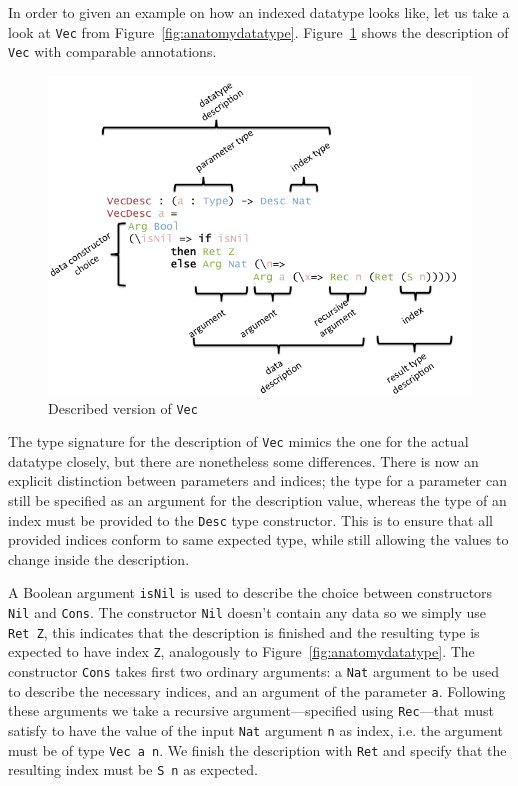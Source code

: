 \documentclass{ituthesis}
\newcommand{\ttconstructor}[1]{\textcolor{constructor-color}{\texttt{#1}}}
\newcommand{\tttype}[1]{\textcolor{type-color}{\texttt{#1}}}
\newcommand{\ttvar}[1]{\textcolor{local-var-color}{\texttt{#1}}}
\theoremstyle{definition}
\begin{document}
In order to given an example on how an indexed datatype looks like, let us take a look at \tttype{Vec} from Figure~\ref{fig:anatomydatatype}. Figure~\ref{fig:descvec} shows the description of \tttype{Vec} with comparable annotations.

\begin{figure}[ht]
\begin{center}
    \includegraphics[scale=0.5]{Figures/VectorDescription.png}
\end{center}
\caption{Described version of \tttype{Vec}}
\label{fig:descvec}
\end{figure}


The type signature for the description of \tttype{Vec} mimics the one for the actual datatype closely, but there are nonetheless some differences.
There is now an explicit distinction between parameters and indices; the type for a parameter can still be specified as an argument for the description value,
whereas the type of an index must be provided to the \tttype{Desc} type constructor.
This is to ensure that all provided indices conform to same expected type, while still allowing the values to change inside the description.

A Boolean argument \ttvar{isNil} is used to describe the choice between constructors \ttconstructor{Nil} and \ttconstructor{Cons}.
The constructor \ttconstructor{Nil} doesn't contain any data so we simply use \ttconstructor{Ret~Z}, this indicates that the description is finished and the resulting type is expected to have index \ttconstructor{Z}, analogously to Figure~\ref{fig:anatomydatatype}.
The constructor \ttconstructor{Cons} takes first two ordinary arguments: a \tttype{Nat} argument
to be used to describe the necessary indices, and an argument of the parameter \ttvar{a}. Following these arguments we take a recursive argument---specified using \ttconstructor{Rec}---that must satisfy to have the value of the input \tttype{Nat} argument \ttvar{n} as index, i.e. the argument must be of type \tttype{Vec}~\ttvar{a~n}. We finish the description with \ttconstructor{Ret} and specify that the resulting index must be \ttconstructor{S}~\ttvar{n} as expected.
\end{document}
